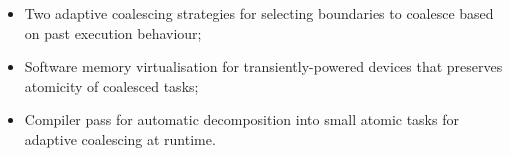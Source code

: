 \begin{itemize}
	\item Two adaptive coalescing strategies for selecting boundaries to coalesce based on past execution behaviour;
	\item Software memory virtualisation for transiently-powered devices that preserves atomicity of coalesced tasks;
	\item Compiler pass for automatic decomposition into small atomic tasks for adaptive coalescing at runtime.
\end{itemize}






